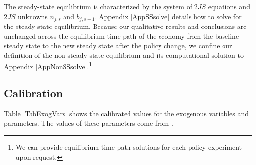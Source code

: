 \documentclass[letterpaper,12pt]{article}
\theoremstyle{definition}
\begin{document}
    \begin{spacing}{1.5}
    \vspace{10mm}

    The steady-state equilibrium is characterized by the system of $2JS$ equations and $2JS$ unknowns $\bar{n}_{j,s}$ and $\bar{b}_{j,s+1}$. Appendix \ref{AppSSsolve} details how to solve for the steady-state equilibrium. Because our qualitative results and conclusions are unchanged across the equilibrium time path of the economy from the baseline steady state to the new steady state after the policy change, we confine our definition of the non-steady-state equilibrium and its computational solution to Appendix \ref{AppNonSSsolve}.\footnote{We can provide equilibrium time path solutions for each policy experiment upon request.}


  \subsection{Calibration}\label{SecCalib}

    Table \ref{TabExogVars} shows the calibrated values for the exogenous variables and parameters. The values of these parameters come from \citet{DEMPRS2015}. 


\end{spacing}
\end{document}
